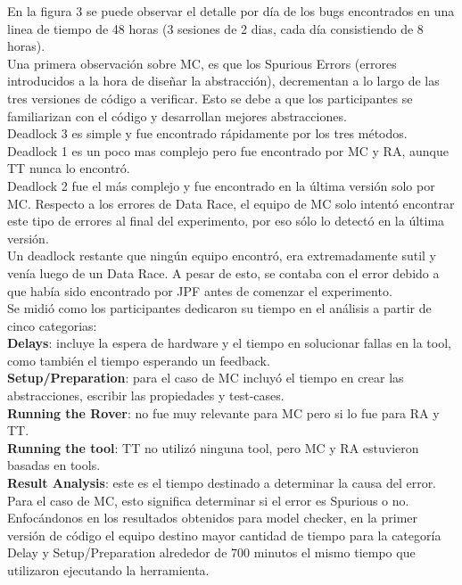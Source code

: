 \documentclass[runningheads]{llncs}
\begin{document}
En la figura 3 se puede observar el detalle por d\'ia de los bugs encontrados en una linea de tiempo de 48 horas (3 sesiones de 2 dias, cada d\'ia consistiendo de 8 horas).\\ Una primera observaci\'on sobre MC, es que los Spurious Errors (errores introducidos a la hora de dise\~nar la abstracci\'on), decrementan a lo largo de las tres versiones de c\'odigo a verificar. Esto se debe a que los participantes se familiarizan con el c\'odigo y desarrollan mejores abstracciones.\\
 Deadlock 3 es simple y fue encontrado r\'apidamente por los tres m\'etodos. Deadlock 1 es un poco mas complejo pero fue encontrado por MC y RA, aunque TT nunca lo encontr\'o.\\
 Deadlock 2 fue el m\'as complejo y fue encontrado en la \'ultima versi\'on solo por MC. Respecto a los errores de Data Race, el equipo de MC solo intent\'o encontrar este tipo de errores al final del experimento, por eso s\'olo lo detect\'o en la \'ultima versi\'on.\\
 Un deadlock restante que ning\'un equipo encontr\'o, era extremadamente sutil y ven\'ia luego de un Data Race. A pesar de esto, se contaba con el error debido a que hab\'ia sido encontrado por JPF antes de comenzar el experimento.\\
Se midi\'o como los participantes dedicaron su tiempo en el an\'alisis a partir de cinco categorias:\\
\textbf{Delays}: incluye la espera de hardware y el tiempo en solucionar fallas en la tool, como tambi\'en el tiempo esperando un feedback.\\
\textbf{Setup/Preparation}: para el caso de MC incluy\'o el tiempo en crear las abstracciones, escribir las propiedades y test-cases.\\
\textbf{Running the Rover}: no fue muy relevante para MC pero si lo fue para RA y TT.\\
\textbf{Running the tool}: TT no utiliz\'o ninguna tool, pero MC y RA estuvieron basadas en tools.\\
\textbf{Result Analysis}: este es el tiempo destinado a determinar la causa del error. Para el caso de MC, esto significa determinar si el error es Spurious o no.\\
Enfoc\'andonos en los resultados obtenidos para model checker,  en la primer versi\'on de c\'odigo el equipo destino mayor cantidad de tiempo para la categor\'ia Delay y Setup/Preparation alrededor de 700 minutos el mismo tiempo que utilizaron ejecutando la herramienta.\\
\end{document}
